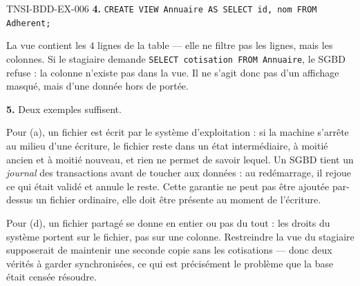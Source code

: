 \begin{corrige}{TNSI-BDD-EX-006}
\textbf{4.} \lstinline{CREATE VIEW Annuaire AS SELECT id, nom FROM Adherent;}

La vue contient les $4$ lignes de la table — elle ne filtre pas les lignes, mais
les colonnes. Si le stagiaire demande \lstinline{SELECT cotisation FROM Annuaire},
le SGBD refuse : la colonne n'existe pas dans la vue. Il ne s'agit donc pas d'un
affichage masqué, mais d'une donnée hors de portée.

\textbf{5.} Deux exemples suffisent.

Pour (a), un fichier est écrit par le système d'exploitation : si la machine
s'arrête au milieu d'une écriture, le fichier reste dans un état intermédiaire, à
moitié ancien et à moitié nouveau, et rien ne permet de savoir lequel. Un SGBD
tient un \emph{journal} des transactions avant de toucher aux données : au
redémarrage, il rejoue ce qui était validé et annule le reste. Cette garantie ne
peut pas être ajoutée par-dessus un fichier ordinaire, elle doit être présente au
moment de l'écriture.

Pour (d), un fichier partagé se donne en entier ou pas du tout : les droits du
système portent sur le fichier, pas sur une colonne. Restreindre la vue du
stagiaire supposerait de maintenir une seconde copie sans les cotisations — donc
deux vérités à garder synchronisées, ce qui est précisément le problème que la
base était censée résoudre.
\end{corrige}
